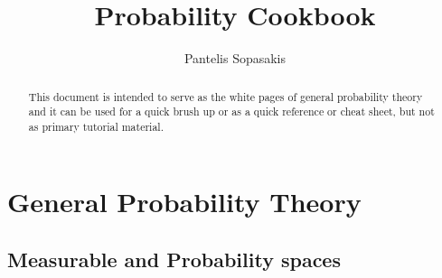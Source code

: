 \documentclass[a4paper,10pt]{article}
\title{Probability Cookbook}
\author{Pantelis Sopasakis}
\begin{document}
\maketitle
\tableofcontents

\begin{abstract}
 This document is intended to serve as the white pages of general probability
 theory and it can be used for a quick brush up or as a quick reference or 
 cheat sheet, but not as primary tutorial material.
\end{abstract}

\section{General Probability Theory}

\subsection{Measurable and Probability spaces}
\end{document}
